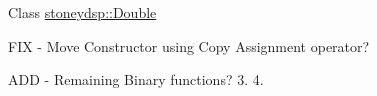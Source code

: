 
\begin{DoxyRefList}
\item[Class \mbox{\hyperlink{classstoneydsp_1_1_double}{stoneydsp\+::Double}} ]\label{todo__todo000001}%
%

\begin{DoxyEnumerate}
\item FIX -\/ Move Constructor using Copy Assignment operator?
\item ADD -\/ Remaining Binary functions? 3. 4. 
\end{DoxyEnumerate}
\end{DoxyRefList}
